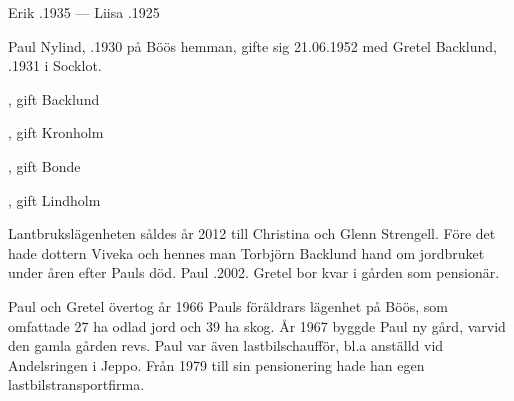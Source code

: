 Erik .1935  ---  Liisa .1925






Paul Nylind, .1930 på Böös hemman, gifte sig 21.06.1952 med Gretel Backlund, .1931 i Socklot.
\begin{jhchildren}
  \item {}, gift Backlund
  \item {}, gift Kronholm
  \item {}, gift Bonde
  \item {}, gift Lindholm
\end{jhchildren}
Lantbrukslägenheten såldes år 2012 till Christina och Glenn Strengell. Före det hade dottern Viveka och hennes man Torbjörn Backlund hand om jordbruket under åren efter Pauls död. Paul .2002. Gretel bor kvar i gården som pensionär.


Paul och Gretel övertog år 1966 Pauls föräldrars lägenhet på Böös, som omfattade 27 ha odlad jord och 39 ha skog. År 1967 byggde Paul ny gård, varvid den gamla gården revs. Paul var även lastbilschaufför, bl.a anställd vid Andelsringen i Jeppo. Från 1979 till sin pensionering hade han egen lastbilstransportfirma.





